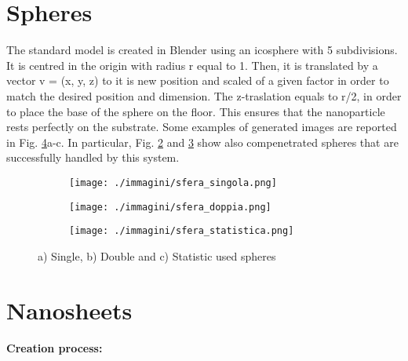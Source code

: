\section{Spheres}

The standard model is created in Blender using an icosphere with 5 subdivisions. It is centred in the origin with radius r equal to 1.
Then, it is translated by a vector v = (x, y, z) to it is new position and scaled of a given factor in order to match the desired position and dimension. The z-traslation equals to r/2, in order to place the base of the sphere on the floor. This ensures that the nanoparticle rests perfectly on the substrate.
Some examples of generated images are reported in Fig. \ref{fig:sphere}a-c. In particular, Fig. \ref{fig:sphere_b} and \ref{fig:sphere_c} show also compenetrated spheres that are successfully handled by this system.

\begin{figure}[ht]
    \centering
    \begin{subfigure}[b]{0.32\textwidth}
        \texttt{[image: ./immagini/sfera\_singola.png]}
        \caption{}
        \label{fig:sphere_a}
    \end{subfigure}
    \hfill
    \begin{subfigure}[b]{0.32\textwidth}
        \texttt{[image: ./immagini/sfera\_doppia.png]}
        \caption{}
        \label{fig:sphere_b}
    \end{subfigure}
    \hfill
    \begin{subfigure}[b]{0.32\textwidth}
        \texttt{[image: ./immagini/sfera\_statistica.png]}
        \caption{}
        \label{fig:sphere_c}
    \end{subfigure}
    \caption{a) Single, b) Double and  c) Statistic used spheres}
    \label{fig:sphere}
\end{figure}

\newpage

\section{Nanosheets}

\paragraph{Creation process: }

